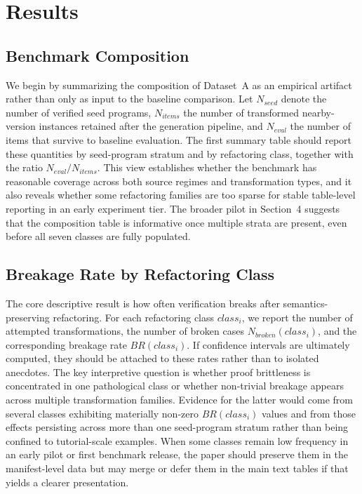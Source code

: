 \section{Results}

\subsection{Benchmark Composition}

We begin by summarizing the composition of Dataset~A as an empirical artifact rather than only as input to the baseline comparison. Let $N_{\mathit{seed}}$ denote the number of verified seed programs, $N_{\mathit{items}}$ the number of transformed nearby-version instances retained after the generation pipeline, and $N_{\mathit{eval}}$ the number of items that survive to baseline evaluation. The first summary table should report these quantities by seed-program stratum and by refactoring class, together with the ratio $N_{\mathit{eval}} / N_{\mathit{items}}$. This view establishes whether the benchmark has reasonable coverage across both source regimes and transformation types, and it also reveals whether some refactoring families are too sparse for stable table-level reporting in an early experiment tier. The broader pilot in Section~4 suggests that the composition table is informative once multiple strata are present, even before all seven classes are fully populated.



\subsection{Breakage Rate by Refactoring Class}

The core descriptive result is how often verification breaks after semantics-preserving refactoring. For each refactoring class $class_i$, we report the number of attempted transformations, the number of broken cases $N_{\mathit{broken}}(class_i)$, and the corresponding breakage rate $BR(class_i)$. If confidence intervals are ultimately computed, they should be attached to these rates rather than to isolated anecdotes. The key interpretive question is whether proof brittleness is concentrated in one pathological class or whether non-trivial breakage appears across multiple transformation families. Evidence for the latter would come from several classes exhibiting materially non-zero $BR(class_i)$ values and from those effects persisting across more than one seed-program stratum rather than being confined to tutorial-scale examples. When some classes remain low frequency in an early pilot or first benchmark release, the paper should preserve them in the manifest-level data but may merge or defer them in the main text tables if that yields a clearer presentation.

